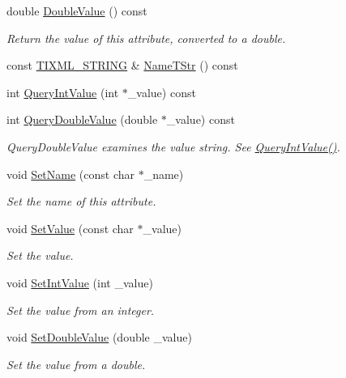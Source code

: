 \begin{DoxyCompactItemize}
double \hyperlink{class_ti_xml_attribute_a2880ddef53fc7522c99535273954d230}{Double\+Value} () const 
\begin{DoxyCompactList}\small\item\em Return the value of this attribute, converted to a double. \end{DoxyCompactList}\item 
const \hyperlink{tinyxml_8h_a92bada05fd84d9a0c9a5bbe53de26887}{T\+I\+X\+M\+L\+\_\+\+S\+T\+R\+I\+N\+G} \& \hyperlink{class_ti_xml_attribute_a64cee17bceb8232eb0736d26dd082d79}{Name\+T\+Str} () const 
\item 
int \hyperlink{class_ti_xml_attribute_ad6c93088ee21af41a107931223339344}{Query\+Int\+Value} (int $\ast$\+\_\+value) const 
\item 
int \hyperlink{class_ti_xml_attribute_ac87b2a8489906a5d7aa2875f20be3513}{Query\+Double\+Value} (double $\ast$\+\_\+value) const 
\begin{DoxyCompactList}\small\item\em Query\+Double\+Value examines the value string. See \hyperlink{class_ti_xml_attribute_ad6c93088ee21af41a107931223339344}{Query\+Int\+Value()}. \end{DoxyCompactList}\item 
void \hyperlink{class_ti_xml_attribute_ab7fa3d21ff8d7c5764cf9af15b667a99}{Set\+Name} (const char $\ast$\+\_\+name)
\begin{DoxyCompactList}\small\item\em Set the name of this attribute. \end{DoxyCompactList}\item 
void \hyperlink{class_ti_xml_attribute_a2dae44178f668b3cb48101be4f2236a0}{Set\+Value} (const char $\ast$\+\_\+value)
\begin{DoxyCompactList}\small\item\em Set the value. \end{DoxyCompactList}\item 
void \hyperlink{class_ti_xml_attribute_a7e065df640116a62ea4f4b7da5449cc8}{Set\+Int\+Value} (int \+\_\+value)
\begin{DoxyCompactList}\small\item\em Set the value from an integer. \end{DoxyCompactList}\item 
void \hyperlink{class_ti_xml_attribute_a0316da31373496c4368ad549bf711394}{Set\+Double\+Value} (double \+\_\+value)
\begin{DoxyCompactList}\small\item\em Set the value from a double. \end{DoxyCompactList}\item 

\end{DoxyCompactItemize}
